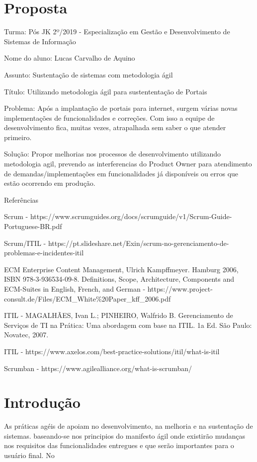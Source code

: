 \section{Proposta}
Turma: Pós JK 2º/2019 - Especialização em Gestão e Desenvolvimento de Sistemas de Informação



Nome do aluno: Lucas Carvalho de Aquino



Assunto: Sustentação de sistemas com metodologia ágil 



Título: Utilizando metodologia ágil para sustententação de Portais 

Problema:  Após a implantação de portais para internet, surgem várias novas implementações de funcionalidades e correções. Com isso a equipe de desenvolvimento fica, muitas vezes, atrapalhada sem saber o que atender primeiro.

Solução: Propor melhorias nos processos de desenvolvimento utilizando metodologia agil, prevendo as interferencias do Product Owner para atendimento de demandas/implementações em funcionalidades já disponíveis ou erros que estão ocorrendo em produção.



Referências 


Scrum  - https://www.scrumguides.org/docs/scrumguide/v1/Scrum-Guide-Portuguese-BR.pdf

Scrum/ITIL  - https://pt.slideshare.net/Exin/scrum-no-gerenciamento-de-problemas-e-incidentes-itil

ECM Enterprise Content Management, Ulrich Kampffmeyer. Hamburg 2006, ISBN 978-3-936534-09-8. Definitions, Scope, Architecture, Components and ECM-Suites in English, French, and German - https://www.project-consult.de/Files/ECM\_White\%20Paper\_kff\_2006.pdf

ITIL - MAGALHÃES, Ivan L.; PINHEIRO, Walfrido B. Gerenciamento de Serviços de TI na Prática: Uma abordagem com base na ITIL. 1a Ed. São Paulo: Novatec, 2007.

ITIL - https://www.axelos.com/best-practice-solutions/itil/what-is-itil


Scrumban - https://www.agilealliance.org/what-is-scrumban/


\section*{Introdução}

As práticas agéis de apoiam no desenvolvimento, na melhoria e na sustentação de sistemas. baseando-se nos principios do manifesto ágil onde existirão mudanças nos requisitos das funcionalidades entregues e que serão importantes para o usuário final.
No 


